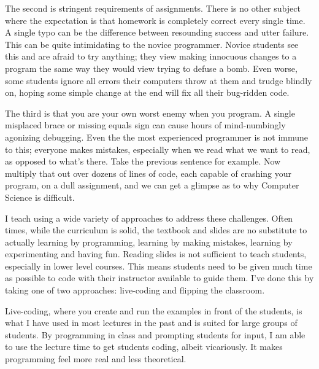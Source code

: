 \documentclass[a4paper]{article}
\begin{document}
The second is stringent requirements of assignments.
There is no other subject where the expectation is that homework is completely correct every single time.
A single typo can be the difference between resounding success and utter failure.
This can be quite intimidating to the novice programmer.
Novice students see this and are afraid to try anything; they view making innocuous changes to a program the same way they would view trying to defuse a bomb.
Even worse, some students ignore all errors their computers throw at them and trudge blindly on, hoping some simple change at the end will fix all their bug-ridden code.


The third is that you are your own worst enemy when you program.
A single misplaced brace or missing equals sign can cause hours of mind-numbingly agonizing debugging.
Even the the 
most experienced programmer is not immune to this; everyone makes mistakes, especially when we read what we want to read, as opposed to what's there.
Take the previous sentence for example.
Now multiply that out over dozens of lines of code, each capable of crashing your program, on a dull assignment, and we can get a glimpse as to why Computer Science is difficult.



I teach using a wide variety of approaches to address these challenges.
Often times, while the curriculum is solid, the textbook and slides are no substitute to actually learning by programming, learning by making mistakes, learning by experimenting and having fun.
Reading slides is not sufficient to teach students, especially in lower level courses.
This means students need to be given much time as possible to code with their instructor available to guide them.
I've done this by taking one of two approaches: live-coding and flipping the classroom.

Live-coding, where you create and run the examples in front of the students, is what I have used in most lectures in the past and is suited for large groups of students.
By programming in class and prompting students for input, I am able to use the lecture time to get students coding, albeit vicariously.
It makes programming feel more real and less theoretical.
\end{document}
